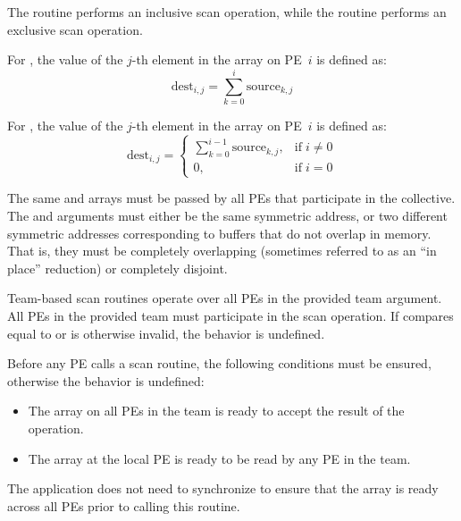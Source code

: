 \begin{apidefinition}
{  The  routine performs an inclusive scan
  operation, while the  routine performs an
  exclusive scan operation.

  For , the value of the $j$-th element in
  the  array on \ac{PE}~$i$ is defined as:
  \begin{equation*}
    \textrm{dest}_{i,j} = \displaystyle\sum_{k=0}^{i} \textrm{source}_{k,j}
  \end{equation*}

  For , the value of the $j$-th element in
  the  array on \ac{PE}~$i$ is defined as:
  \begin{equation*}
    \textrm{dest}_{i,j} =
    \begin{cases}
    \displaystyle\sum_{k=0}^{i-1} \textrm{source}_{k,j}, & \text{if} \; i \neq 0 \\
    0,  & \text{if} \; i = 0
    \end{cases}
  \end{equation*}


  The same \source{} and \dest{} arrays must be passed by all \acp{PE} that
  participate in the collective.
  The \source{} and \dest{} arguments must either be the same
  symmetric address, or two different symmetric addresses
  corresponding to buffers that do not overlap in memory.
  That is, they must be completely overlapping (sometimes referred to as an
  ``in place'' reduction) or completely disjoint.

  Team-based scan routines operate over all \acp{PE} in the provided
  team argument. All \acp{PE} in the provided team must participate in
  the scan operation.  If  compares equal to
   or is otherwise invalid, the
  behavior is undefined.

  Before any \ac{PE} calls a scan routine, the following conditions must be
  ensured, otherwise the behavior is undefined:
  \begin{itemize}
      \item The \dest{} array on all \acp{PE} in the team is ready to accept
          the result of the operation.
      \item The \source{} array at the local \ac{PE} is ready to be read by
          any \ac{PE} in the team.
  \end{itemize}
  The application does not need to synchronize to ensure that the \source{}
  array is ready across all \acp{PE} prior to calling this routine.

}
\end{apidefinition}
